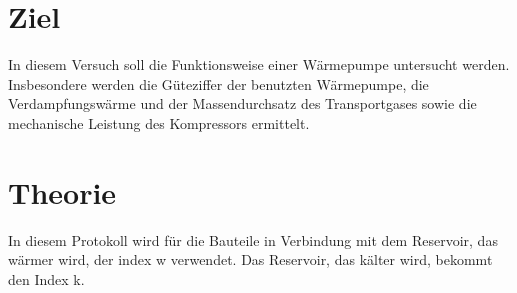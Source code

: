 \section{Ziel}
In diesem Versuch soll die Funktionsweise einer Wärmepumpe untersucht werden.
Insbesondere werden die Güteziffer der benutzten Wärmepumpe, die Verdampfungswärme und der Massendurchsatz des Transportgases
sowie die mechanische Leistung des Kompressors ermittelt.

\section{Theorie}
In diesem Protokoll wird für die Bauteile in Verbindung mit dem Reservoir, das wärmer wird,
der index w verwendet. 
Das Reservoir, das kälter wird, bekommt den Index k.

%










